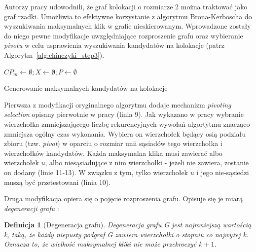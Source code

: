 \documentclass[12pt]{article}
\newtheorem{defin}{Definicja}
\begin{document}
Autorzy pracy \cite{chinczyki} udowodnili, że graf kolokacji o rozmiarze 2 można traktować jako graf rzadki. Umożliwia to efektywne korzystanie z algorytmu Brona-Kerboscha \cite{kerbosz} do wyszukiwania maksymalnych klik w grafie nieskierowanym. Wprowadzone zostały do niego pewne modyfikacje uwzględniające rozproszenie grafu oraz wybieranie \textit{pivotu} w celu usprawienia wyszukiwania kandydatów na kolokacje (patrz Algorytm~\ref{alg:chinczyki_step3}).

\begin{algorithm}

$CP_{m} \leftarrow \emptyset; X \leftarrow \emptyset; P \leftarrow \emptyset$\;

\caption{Generowanie maksymalnych kandydatów na kolokacje}
\label{alg:chinczyki_step3}
\end{algorithm}

Pierwsza z modyfikacji oryginalnego algorytmu dodaje mechanizm \textit{pivoting selection} opisany pierwotnie w pracy \cite{pivot} (linia 9). Jak wykazano w pracy \cite{pivot2} wybranie wierzchołka zmniejszającego liczbę rekurencyjnych wywołań algortytmu znacząco zmniejsza ogólny czas wykonania. Wybiera on wierzchołek będący osią podziału zbioru (tzw. \textit{pivot}) w oparciu o rozmiar unii sąsiadów tego wierzchołka i wierzchołków kandydatów. Każda maksymalna klika musi zawierać albo wierzchołek $ u $, albo niesąsiadujące z nim wierzchołki - jeżeli nie zawiera, zostanie on dodany (linie 11-13). W związku z tym, tylko wierzchołek $ u $ i jego nie-sąsiedzi muszą być przetestowani (linia 10).

Druga modyfikacja opiera się o pojęcie rozproszenia grafu. Opisuje się je miarą \textit{degeneracji grafu} \cite{matusiak}:
\begin{defin}[Degeneracja grafu]
Degeneracja grafu G jest najmniejszą wartością k, taką, że każdy niepusty podgraf G zawiera wierzchołki o stopniu co najwyżej k. Oznacza to, że wielkość maksymalnej kliki nie może przekroczyć $k + 1$.
\label{def:degeneracy}
\end{defin}
\end{document}
